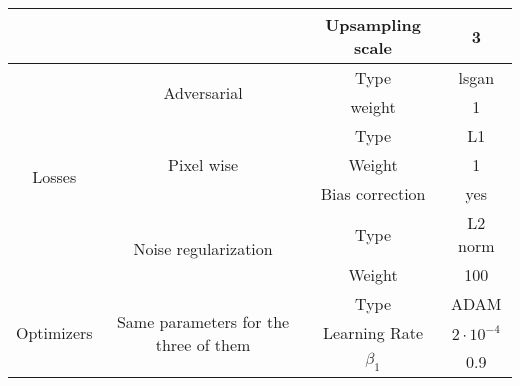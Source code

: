 \begin{table}[H]
{\begin{tabular}{|ccc|cc|}
    \multicolumn{3}{|c|}{}                                                                                                                  & Upsampling scale             & 3                  \\ \hline
    \multicolumn{1}{|c|}{\multirow{7}{*}{Losses}}             & \multicolumn{2}{c|}{\multirow{2}{*}{Adversarial}}                           & Type                         & lsgan              \\
    \multicolumn{1}{|c|}{}                                    & \multicolumn{2}{c|}{}                                                       & weight                       & 1                  \\ \cline{2-5} 
    \multicolumn{1}{|c|}{}                                    & \multicolumn{2}{c|}{\multirow{3}{*}{Pixel wise}}                            & Type                         & L1                 \\
    \multicolumn{1}{|c|}{}                                    & \multicolumn{2}{c|}{}                                                       & Weight                       & 1                  \\
    \multicolumn{1}{|c|}{}                                    & \multicolumn{2}{c|}{}                                                       & Bias correction              & yes                \\ \cline{2-5} 
    \multicolumn{1}{|c|}{}                                    & \multicolumn{2}{c|}{\multirow{2}{*}{Noise regularization}}                  & Type                         & L2 norm            \\
    \multicolumn{1}{|c|}{}                                    & \multicolumn{2}{c|}{}                                                       & Weight                       & 100                \\ \hline
    \multicolumn{1}{|c|}{\multirow{5}{*}{Optimizers}}         & \multicolumn{2}{c|}{\multirow{5}{*}{Same parameters for the three of them}} & Type                         & ADAM               \\
    \multicolumn{1}{|c|}{}                                    & \multicolumn{2}{c|}{}                                                       & Learning Rate                & $2 \cdot 10^{-4}$  \\
    \multicolumn{1}{|c|}{}                                    & \multicolumn{2}{c|}{}                                                       & $\beta_1$                    & 0.9                \\

\end{tabular}}
\end{table}
